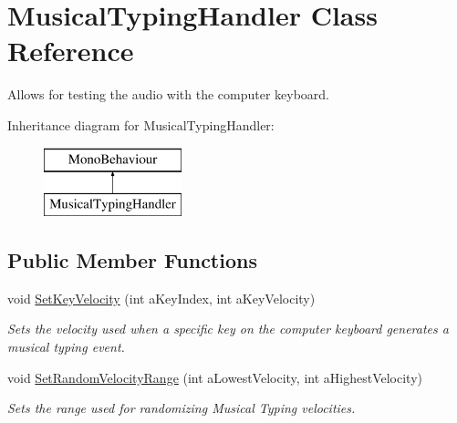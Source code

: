 \hypertarget{class_musical_typing_handler}{}\section{Musical\+Typing\+Handler Class Reference}
\label{class_musical_typing_handler}


Allows for testing the audio with the computer keyboard.  


Inheritance diagram for Musical\+Typing\+Handler\+:\begin{figure}[H]
\begin{center}
\leavevmode
\includegraphics[height=2.000000cm]{class_musical_typing_handler}
\end{center}
\end{figure}
\subsection*{Public Member Functions}
\begin{DoxyCompactItemize}
\item 
void \hyperlink{group___mus_typ_pub_func_ga02f86b46bb63dc751b669035b7aa5ce0}{Set\+Key\+Velocity} (int a\+Key\+Index, int a\+Key\+Velocity)
\begin{DoxyCompactList}\small\item\em Sets the velocity used when a specific key on the computer keyboard generates a musical typing event. \end{DoxyCompactList}\item 
void \hyperlink{group___mus_typ_pub_func_gaf6ba35e3a081cff62fa963ed32d218c8}{Set\+Random\+Velocity\+Range} (int a\+Lowest\+Velocity, int a\+Highest\+Velocity)
\begin{DoxyCompactList}\small\item\em Sets the range used for randomizing Musical Typing velocities. \end{DoxyCompactList}\end{DoxyCompactItemize}
